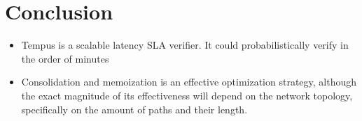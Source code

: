 \documentclass[10pt,sigconf,letterpaper,anonymous,nonacm]{acmart}
\begin{document}







\section{Conclusion} \label{sec:conc}
\begin{itemize}
    \item Tempus is a scalable latency SLA verifier. It could probabilistically verify in the order of minutes
    \item Consolidation and memoization is an effective optimization strategy, although the exact magnitude of 
        its effectiveness will depend on the network topology, specifically on the amount of paths and their 
        length.
\end{itemize}



\end{document}
